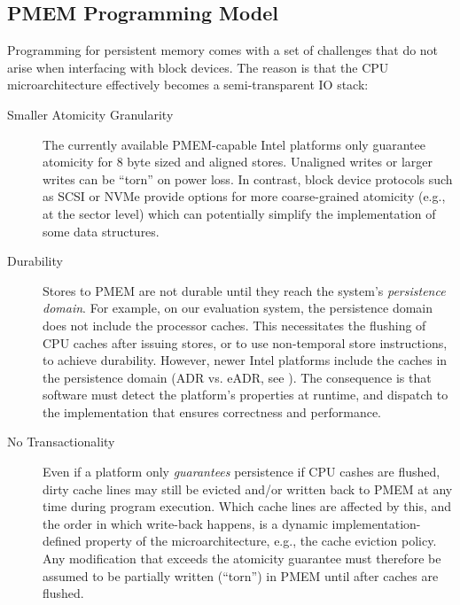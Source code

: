 \documentclass[12pt,a4paper,twoside]{book}
\begin{document}
\subsection{PMEM Programming Model}\label{sec:background:pmemprogrammingmodel}

Programming for persistent memory comes with a set of challenges that do not arise when interfacing with block devices.
The reason is that the CPU microarchitecture effectively becomes a semi-transparent IO stack:

\begin{description}
    \item[Smaller Atomicity Granularity] The currently available PMEM-capable Intel platforms only guarantee atomicity for 8 byte sized and aligned stores.
        Unaligned writes or larger writes can be ``torn'' on power loss.
        In contrast, block device protocols such as SCSI or NVMe provide options for more coarse-grained atomicity (e.g., at the sector level) which can potentially simplify the implementation of some data structures.
        \cite{rudoffPersistentMemoryProgramming2017,AreDiskSectorWritesAtomic}

    \item[Durability] Stores to PMEM are not durable until they reach the system's \textit{persistence domain}.
        For example, on our evaluation system, the persistence domain does not include the processor caches.
        This necessitates the flushing of CPU caches after issuing stores, or to use non-temporal store instructions, to achieve durability.
        However, newer Intel platforms include the caches in the persistence domain (ADR vs. eADR, see \cite{EADRNewOpportunities}).
        The consequence is that software must detect the platform's properties at runtime, and dispatch to the implementation that ensures correctness and performance.
        \cite{rudoffPersistentMemoryProgramming2017}

    \item[No Transactionality] Even if a platform only \textit{guarantees} persistence if CPU cashes are flushed, dirty cache lines may still be evicted and/or written back to PMEM at any time during program execution.
        Which cache lines are affected by this, and the order in which write-back happens, is a dynamic implementation-defined property of the microarchitecture, e.g., the cache eviction policy.
        Any modification that exceeds the atomicity guarantee must therefore be assumed to be partially written (``torn'') in PMEM until after caches are flushed.~\cite{Scargall2020}


\end{description}
\end{document}
